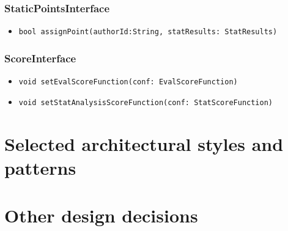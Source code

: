 \subsubsection{StaticPointsInterface}
\begin{itemize}
    \item \texttt{bool assignPoint(authorId:String, statResults: StatResults)}
\end{itemize}

\subsubsection{ScoreInterface}
\begin{itemize}
    \item \texttt{void setEvalScoreFunction(conf: EvalScoreFunction)}
    \item \texttt{void setStatAnalysisScoreFunction(conf: StatScoreFunction)}
\end{itemize}



\section{Selected architectural styles and patterns}
\label{s:selected-architectural-styles-and-patterns}%

\section{Other design decisions}
\label{s:other-design-decisions}%
